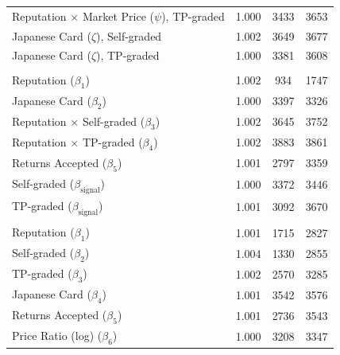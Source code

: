 \documentclass[11pt,letterpaper]{article}
\theoremstyle{definition}
\begin{document}
\begin{table}[H]
\begin{tabular}[t]{lccc}
\hspace{1em}Reputation $\times$ Market Price ($\psi$), TP-graded & 1.000 & 3433 & 3653\\
\hspace{1em}Japanese Card ($\zeta$), Self-graded & 1.002 & 3649 & 3677\\
\hspace{1em}Japanese Card ($\zeta$), TP-graded & 1.000 & 3381 & 3608\\
\addlinespace[0.3em]
\multicolumn{4}{l}{\fontsize{8}{9.6}\selectfont \textbf{Price Equation}}\\
\hspace{1em}Reputation ($\beta_1$) & 1.002 & 934 & 1747\\
\hspace{1em}Japanese Card ($\beta_2$) & 1.000 & 3397 & 3326\\
\hspace{1em}Reputation $\times$ Self-graded ($\beta_3$) & 1.002 & 3645 & 3752\\
\hspace{1em}Reputation $\times$ TP-graded ($\beta_4$) & 1.002 & 3883 & 3861\\
\hspace{1em}Returns Accepted ($\beta_5$) & 1.001 & 2797 & 3359\\
\hspace{1em}Self-graded ($\beta_{\text{signal}}$) & 1.000 & 3372 & 3446\\
\hspace{1em}TP-graded ($\beta_{\text{signal}}$) & 1.001 & 3092 & 3670\\
\addlinespace[0.3em]
\multicolumn{4}{l}{\fontsize{8}{9.6}\selectfont \textbf{Sold Equation}}\\
\hspace{1em}Reputation ($\beta_1$) & 1.001 & 1715 & 2827\\
\hspace{1em}Self-graded ($\beta_2$) & 1.004 & 1330 & 2855\\
\hspace{1em}TP-graded ($\beta_3$) & 1.002 & 2570 & 3285\\
\hspace{1em}Japanese Card ($\beta_4$) & 1.001 & 3542 & 3576\\
\hspace{1em}Returns Accepted ($\beta_5$) & 1.001 & 2736 & 3543\\
\hspace{1em}Price Ratio (log) ($\beta_6$) & 1.000 & 3208 & 3347\\

\end{tabular}
\end{table}
\end{document}
